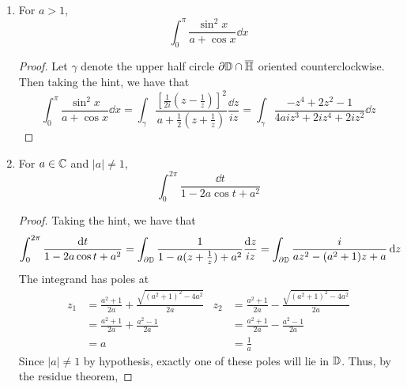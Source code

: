 \documentclass[../psets.tex]{subfiles}
\begin{document}
\begin{enumerate}[label={\textbf{\arabic*.}}]
\begin{enumerate}
        \item For $a>1$,
        \begin{equation*}
            \int_0^\pi\frac{\sin^2x}{a+\cos x}\dd{x}
        \end{equation*}
        \begin{proof}
            Let $\gamma$ denote the upper half circle $\partial\mathbb{D}\cap\overline{\mathbb{H}}$ oriented counterclockwise. Then taking the hint, we have that
            \begin{equation*}
                \int_0^\pi\frac{\sin^2x}{a+\cos x}\dd{x} = \int_\gamma\frac{\left[ \frac{1}{2i}\left( z-\frac{1}{z} \right) \right]^2}{a+\frac{1}{2}\left( z+\frac{1}{z} \right)}\frac{\dd{z}}{iz}
                = \int_\gamma\frac{-z^4+2z^2-1}{4aiz^3+2iz^4+2iz^2}\dd{z}
            \end{equation*}
        \end{proof}
        \item For $a\in\mathbb{C}$ and $|a|\neq 1$,
        \begin{equation*}
            \int_0^{2\pi}\frac{\dd{t}}{1-2a\cos t+a^2}
        \end{equation*}
        \begin{proof}
            Taking the hint, we have that
            \begin{equation*}
                \int_0^{2\pi}\frac{\dd{t}}{1-2a\cos t+a^2} = \int_{\partial\mathbb{D}}\frac{1}{1-a(z+\tfrac{1}{z})+a^2}\frac{\dd{z}}{iz}
                = \int_{\partial\mathbb{D}}\frac{i}{az^2-(a^2+1)z+a}\dd{z}
            \end{equation*}
            The integrand has poles at
            \begin{align*}
                z_1 &= \frac{a^2+1}{2a}+\frac{\sqrt{(a^2+1)^2-4a^2}}{2a}&
                    z_2 &= \frac{a^2+1}{2a}-\frac{\sqrt{(a^2+1)^2-4a^2}}{2a}\\
                &= \frac{a^2+1}{2a}+\frac{a^2-1}{2a}&
                    &= \frac{a^2+1}{2a}-\frac{a^2-1}{2a}\\
                &= a&
                    &= \frac{1}{a}
            \end{align*}
            Since $|a|\neq 1$ by hypothesis, exactly one of these poles will lie in $\mathbb{D}$. Thus, by the residue theorem,

\end{proof}
\end{enumerate}
\end{enumerate}
\end{document}
